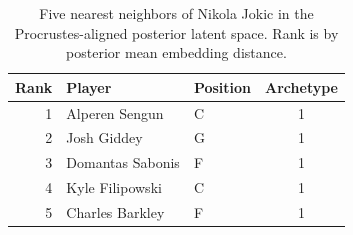 \begin{table}[htbp]
  \centering\small
  \begin{tabular}{rllc}
    \toprule
    Rank & Player & Position & Archetype \\
    \midrule
    1 & Alperen Sengun & C & 1 \\
    2 & Josh Giddey & G & 1 \\
    3 & Domantas Sabonis & F & 1 \\
    4 & Kyle Filipowski & C & 1 \\
    5 & Charles Barkley & F & 1 \\
    \bottomrule
  \end{tabular}
  \caption{Five nearest neighbors of Nikola Jokic in the Procrustes-aligned posterior latent space. Rank is by posterior mean embedding distance.}
  \label{tab:Nikola_Jokic_neighbors}
\end{table}

